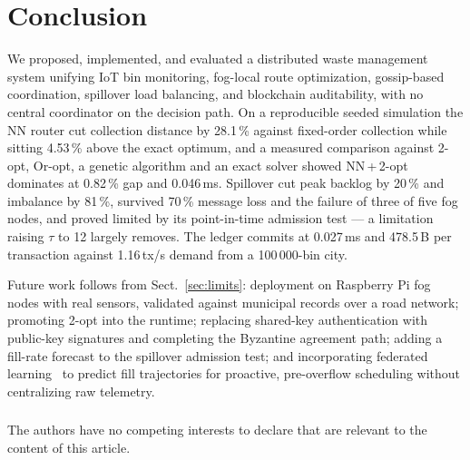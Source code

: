 \documentclass{llncs}
\begin{document}
\section{Conclusion}
\label{sec:conclusion}

We proposed, implemented, and evaluated a distributed waste management system
unifying IoT bin monitoring, fog-local route optimization, gossip-based
coordination, spillover load balancing, and blockchain auditability, with no
central coordinator on the decision path. On a reproducible seeded simulation
the NN router cut collection distance by 28.1\,\% against fixed-order
collection while sitting 4.53\,\% above the exact optimum, and a measured
comparison against 2-opt, Or-opt, a genetic algorithm and an exact solver
showed NN\,+\,2-opt dominates at 0.82\,\% gap and 0.046\,ms. Spillover cut peak
backlog by 20\,\% and imbalance by 81\,\%, survived 70\,\% message loss and the
failure of three of five fog nodes, and proved limited by its point-in-time
admission test --- a limitation raising $\tau$ to 12 largely removes. The
ledger commits at 0.027\,ms and 478.5\,B per transaction against 1.16\,tx/s
demand from a 100\,000-bin city.

Future work follows from Sect.~\ref{sec:limits}: deployment on Raspberry Pi fog
nodes with real sensors, validated against municipal records over a road
network; promoting 2-opt into the runtime; replacing shared-key authentication
with public-key signatures and completing the Byzantine agreement path; adding
a fill-rate forecast to the spillover admission test; and incorporating
federated learning~\cite{mcmahan} to predict fill trajectories for proactive,
pre-overflow scheduling without centralizing raw telemetry.

\begin{credits}
\subsubsection{\discintname}
The authors have no competing interests to declare that are relevant to the
content of this article.
\end{credits}
\end{document}
